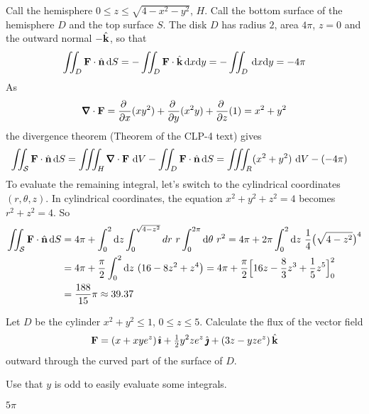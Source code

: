\begin{solution} 
Call the hemisphere $0\le z\le \sqrt{4-x^2-y^2}$, $H$.
Call the bottom surface of the hemisphere $D$ and the top surface $S$.
The disk $D$ has radius $2$, area $4\pi$, $z=0$ and 
the outward normal $-\hat{\mathbf{k}}$, so that
$$
\iint_{D}\mathbf{F}\cdot\hat{\mathbf{n}}\,\mathrm{d}S
=-\iint_{D}\mathbf{F}\cdot\hat{\mathbf{k}}\,\mathrm{d}x\mathrm{d}y
=-\iint_D\,\mathrm{d}x\mathrm{d}y
=-4\pi
$$
As
$$
\vnabla\cdot\vF
=\pdiff{}{x}(xy^2)
+\pdiff{}{y}(x^2y)
+\pdiff{}{z}(1)
=x^2+y^2
$$
the divergence theorem (Theorem  of the CLP-4 text) 
gives
\begin{align*}
\dblInt_{\cS}\vF\cdot\hn\,\dee{S}
&=\tripInt_H\vnabla\cdot\vF\ \dee{V}
-\dblInt_D\vF\cdot\hn\,\dee{S}
=\tripInt_R(x^2+y^2)\ \dee{V}
-(-4\pi)
\end{align*}
To evaluate the remaining integral, let's switch to the
cylindrical coordinates $(r,\theta,z)$. In cylindrical coordinates,
the equation $x^2+y^2+z^2=4$ becomes $r^2+z^2=4$. So
\begin{align*}
\dblInt_{\cS}\vF\cdot\hn\,\dee{S}
&=4\pi+\int_0^2 \dee{z}\int_0^{\sqrt{4-z^2}}dr\ r\int_0^{2\pi}\dee{\theta}\ r^2
=4\pi+2\pi\int_0^2 \dee{z}\ \frac{1}{4}\big(\sqrt{4-z^2}\big)^4\\
&=4\pi+\frac{\pi}{2}\int_0^2 \dee{z}\ (16-8z^2+z^4\big)
=4\pi+\frac{\pi}{2}\Big[16z-\frac{8}{3}z^3+\frac{1}{5}z^5\Big]_0^2 \\
&=\frac{188}{15}\pi\approx39.37
\end{align*}
\end{solution}

\begin{question}[M317 1998D] %
 Let $D$ be the cylinder $x^2+y^2\le 1$, $0\le z\le 5$. Calculate
the flux of the vector field
$$
\mathbf{F}=(x+xye^z)\,\hat{\pmb{\imath}}+\tfrac{1}{2} y^2ze^z\,\hat{\pmb{\jmath}}+(3z-yze^z)\,\hat{\mathbf{k}}
$$
outward through the curved part of the surface of $D$.
\end{question}

\begin{hint} 
Use that $y$ is odd to easily evaluate some integrals.
\end{hint}

\begin{answer} 
$5\pi$
\end{answer}

